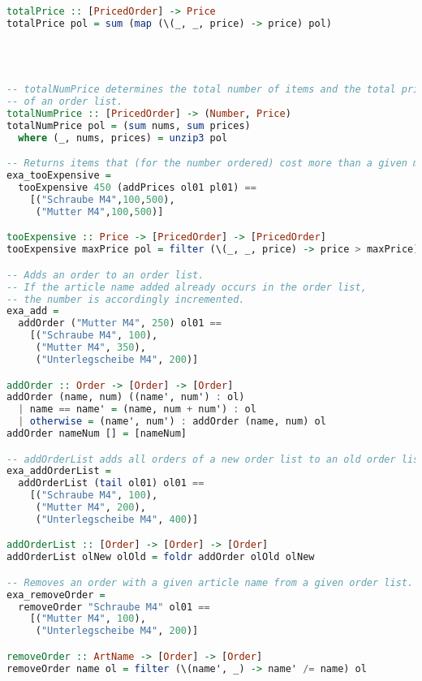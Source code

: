 \begin{lstlisting}[language=Haskell]
totalPrice :: [PricedOrder] -> Price
totalPrice pol = sum (map (\(_, _, price) -> price) pol)




-- totalNumPrice determines the total number of items and the total price
-- of an order list.
totalNumPrice :: [PricedOrder] -> (Number, Price)
totalNumPrice pol = (sum nums, sum prices)
  where (_, nums, prices) = unzip3 pol

-- Returns items that (for the number ordered) cost more than a given maxPrice.
exa_tooExpensive =
  tooExpensive 450 (addPrices ol01 pl01) ==
    [("Schraube M4",100,500),
     ("Mutter M4",100,500)]

tooExpensive :: Price -> [PricedOrder] -> [PricedOrder]
tooExpensive maxPrice pol = filter (\(_, _, price) -> price > maxPrice) pol

-- Adds an order to an order list.
-- If the article name added already occurs in the order list,
-- the number is accordingly incremented.
exa_add =
  addOrder ("Mutter M4", 250) ol01 ==
    [("Schraube M4", 100),
     ("Mutter M4", 350),
     ("Unterlegscheibe M4", 200)]

addOrder :: Order -> [Order] -> [Order]
addOrder (name, num) ((name', num') : ol)
  | name == name' = (name, num + num') : ol
  | otherwise = (name', num') : addOrder (name, num) ol
addOrder nameNum [] = [nameNum]

-- addOrderList adds all orders of a new order list to an old order list.
exa_addOrderList =
  addOrderList (tail ol01) ol01 ==
    [("Schraube M4", 100),
     ("Mutter M4", 200),
     ("Unterlegscheibe M4", 400)]

addOrderList :: [Order] -> [Order] -> [Order]
addOrderList olNew olOld = foldr addOrder olOld olNew

-- Removes an order with a given article name from a given order list.
exa_removeOrder =
  removeOrder "Schraube M4" ol01 ==
    [("Mutter M4", 100),
     ("Unterlegscheibe M4", 200)]

removeOrder :: ArtName -> [Order] -> [Order]
removeOrder name ol = filter (\(name', _) -> name' /= name) ol
\end{lstlisting}

\clearpage
